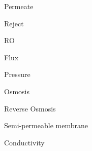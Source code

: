 

Permeate

Reject

RO

Flux

Pressure

Osmosis

Reverse Osmosis

Semi-permeable membrane

Conductivity




